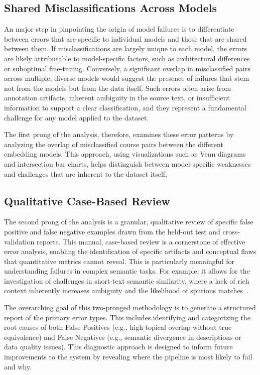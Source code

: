 \subsection{Shared Misclassifications Across Models}\label{ch:3.5.1}
An major step in pinpointing the origin of model failures is to differentiate between errors that are specific to individual models and those that are shared between them. If misclassifications are largely unique to each model, the errors are likely attributable to model-specific factors, such as architectural differences or suboptimal fine-tuning. Conversely, a significant overlap in misclassified pairs across multiple, diverse models would suggest the presence of  failures that stem not from the models but from the data itself. Such errors often arise from annotation artifacts, inherent ambiguity in the source text, or insufficient information to support a clear classification, and they represent a fundamental challenge for any model applied to the dataset.

The first prong of the analysis, therefore, examines these error patterns by analyzing the overlap of misclassified course pairs between the different embedding models. This approach, using visualizations such as Venn diagrams and intersection bar charts, helps distinguish between model-specific weaknesses and challenges that are inherent to the dataset itself.

\subsection{Qualitative Case-Based Review}\label{ch:3.5.2}
The second prong of the analysis is a granular, qualitative review of specific false positive and false negative examples drawn from the held-out test and cross-validation reports. This manual, case-based review is a cornerstone of effective error analysis, enabling the identification of specific artifacts and conceptual flaws that quantitative metrics cannot reveal. This is particularly meaningful for understanding failures in complex semantic tasks. For example, it allows for the investigation of challenges in short-text semantic similarity, where a lack of rich context inherently increases ambiguity and the likelihood of spurious matches~\cite{app13063911}.

The overarching goal of this two-pronged methodology is to generate a structured report of the primary error types. This includes identifying and categorizing the root causes of both False Positives (e.g., high topical overlap without true equivalence) and False Negatives (e.g., semantic divergence in descriptions or data quality issues). This diagnostic approach is designed to inform future improvements to the system by revealing where the pipeline is most likely to fail and why.